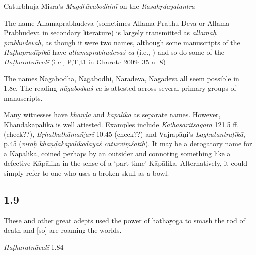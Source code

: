 \begin{ekdosis}
\begin{testimonia}[hp01_008]
Caturbhuja Misra's \emph{Mugdhāvabodhinī} on the \emph{Rasahṛdayatantra}

\begin{versinnote}
\end{versinnote}

\end{testimonia}

\begin{philcomm}[hp01_008]  
The name Allamaprabhudeva (sometimes Allama Prabhu Deva or Allama Prabhudeva in secondary literature) is largely transmitted as \emph{allamaḥ prabhu\-devaḥ}, as though it were two names, although some manuscripts of the \emph{Haṭha\-pradīpikā} have \emph{allamaprabhudevaś ca} (i.e., ) and so do some of the \emph{Haṭharatnāvalī} (i.e., P,T,t1 in Gharote 2009: 35 n. 8).

The names Nāgabodha, Nāgabodhi, Naradeva, Nāgadeva all seem possible in 1.8c. The reading \emph{nāgabodhaś ca} is attested across several primary groups of manuscripts.

Many witnesses have \emph{khaṇḍa} and \emph{kāpālika} as separate names. However, Khaṇḍa\-kāpālika is well attested. Examples include \emph{Kathāsaritsāgara} 121.5 ff. (check??), \emph{Bṛhatkathāmañjarī} 10.45 (check??) and Vajrapāṇi’s \emph{Laghutantraṭīkā}, p.45 (\emph{vīrāḥ khaṇḍakāpālikādayaś caturviṃśatiḥ}). It may be a derogatory name for a Kāpālika, coined perhaps by an outsider and connoting something like a defective Kāpālika in the sense of a ‘part-time’ Kāpālika. Alternatively, it could simply refer to one who uses a broken skull as a bowl.
\end{philcomm}

\subsection*{1.9}
\begin{translation}[hp01_009]
These and other great adepts used the power of hathayoga to smash the rod of death and [so] are roaming the worlds.
\end{translation}

\begin{testimonia}[hp01_009]
\emph{Haṭharatnāvalī} 1.84

\begin{versinnote}
\end{versinnote}


\end{testimonia}
\end{ekdosis}
